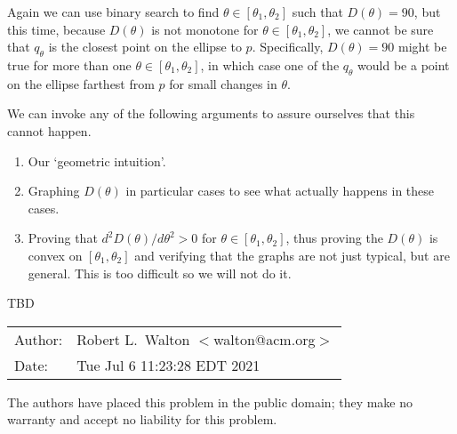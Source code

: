 \documentclass[12pt]{article}
\begin{document}
Again we can use binary search to find
$\theta \in [\theta_1,\theta_2]$ such that
$D(\theta) = 90$, but this time, because $D(\theta)$ is not
monotone for $\theta \in [\theta_1,\theta_2]$, we cannot
be sure that $q_\theta$ is the closest
point on the ellipse to $p$.  Specifically,
$D(\theta) = 90$ might be true for more than one
$\theta \in [\theta_1,\theta_2]$, in which case one of the
$q_\theta$ would be a point on the ellipse farthest from
$p$ for small changes in $\theta$.

We can invoke any of the following arguments to assure
ourselves that this cannot happen.

\begin{enumerate}
\item Our `geometric intuition'.
\item Graphing $D(\theta)$ in particular cases to see what
actually happens in these cases.
\item Proving that $d^2 D(\theta)/d\theta^2 > 0$ for
$\theta \in [\theta_1,\theta_2]$, thus proving the $D(\theta)$
is convex on $[\theta_1,\theta_2]$ and verifying that the graphs
are not just typical, but are general.  This is too difficult
so we will not do it.
\end{enumerate}

TBD





\bigskip

\begin{tabular}{ll}
Author:	      & Robert L.~Walton $<$walton@acm.org$>$ \\
Date:         & Tue Jul  6 11:23:28 EDT 2021

\end{tabular}

The authors have placed this problem in the public domain;
they make no warranty and accept no liability for this problem.
\end{document}
